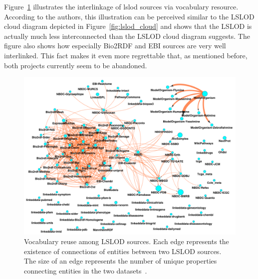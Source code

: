 \documentclass[runningheads]{llncs}
\begin{document}
    Figure~\ref{fig:lslod-cloud-corrected} illustrates the interlinkage of lslod sources via vocabulary resource.
    According to the authors, this illustration can be perceived similar to the LSLOD cloud diagram depicted in Figure~\ref{fig:lslod_cloud} and shows that the LSLOD is actually much less interconnected than the LSLOD cloud diagram suggests.
    The figure also shows how especially Bio2RDF and EBI sources are very well interlinked.
    This fact makes it even more regrettable that, as mentioned before, both projects currently seem to be abandoned.

    \begin{figure}[ht]
        \centering
        \includegraphics[width=\textwidth]{figures/lslod-connectedness}
        \caption{Vocabulary reuse among LSLOD sources. Each edge represents the existence of connections of entities between two LSLOD sources. The size of an edge represents the number of unique properties connecting entities in the two datasets~\citep{kamdar2021empirical}.}
        \label{fig:lslod-cloud-corrected}
    \end{figure}
\end{document}
